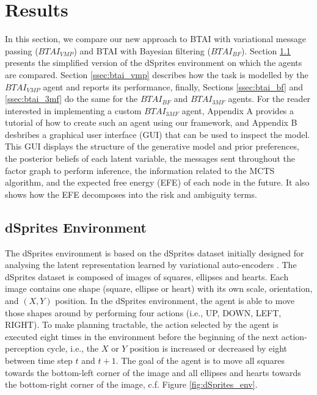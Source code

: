 \documentclass[twoside,11pt]{article}
\begin{document}
\section{Results} \label{sec:results}

In this section, we compare our new approach to BTAI with variational message passing ($BTAI_{VMP}$) and BTAI with Bayesian filtering ($BTAI_{BF}$). Section \ref{ssec:dsprites} presents the simplified version of the dSprites environment on which the agents are compared. Section \ref{ssec:btai_vmp} describes how the task is modelled by the $BTAI_{VMP}$ agent and reports its performance, finally, Sections \ref{ssec:btai_bf} and \ref{ssec:btai_3mf} do the same for the $BTAI_{BF}$ and $BTAI_{3MF}$ agents. For the reader interested in implementing a custom $BTAI_{3MF}$ agent, Appendix A provides a tutorial of how to create such an agent using our framework, and Appendix B desbribes a graphical user interface (GUI) that can be used to inspect the model. This GUI displays the structure of the generative model and prior preferences, the posterior beliefs of each latent variable, the messages sent throughout the factor graph to perform inference, the information related to the MCTS algorithm, and the expected free energy (EFE) of each node in the future. It also shows how the EFE decomposes into the risk and ambiguity terms.

\subsection{dSprites Environment} \label{ssec:dsprites}

The dSprites environment is based on the dSprites dataset \citep{dsprites17} initially designed for analysing the latent representation learned by variational auto-encoders \citep{VAE}. The dSprites dataset is composed of images of squares, ellipses and hearts. Each image contains one shape (square, ellipse or heart) with its own scale, orientation, and $(X,Y)$ position. In the dSprites environment, the agent is able to move those shapes around by performing four actions (i.e., UP, DOWN, LEFT, RIGHT). To make planning tractable, the action selected by the agent is executed eight times in the environment before the beginning of the next action-perception cycle, i.e., the $X$ or $Y$ position is increased or decreased by eight between time step $t$ and $t+1$. The goal of the agent is to move all squares towards the bottom-left corner of the image and all ellipses and hearts towards the bottom-right corner of the image, c.f. Figure \ref{fig:dSprites_env}.
\end{document}
